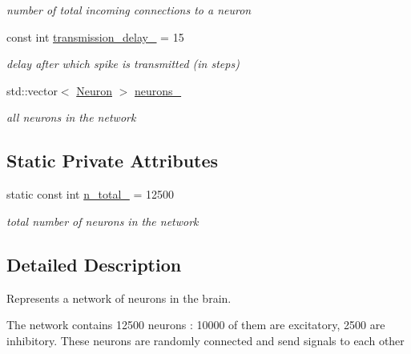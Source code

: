 \begin{DoxyCompactItemize}
\begin{DoxyCompactList}\small\item\em number of total incoming connections to a neuron \end{DoxyCompactList}\item 
\hypertarget{classNetwork_a054ac558c5f02fe3c1ed1ffbfa911d76}{const int \hyperlink{classNetwork_a054ac558c5f02fe3c1ed1ffbfa911d76}{transmission\-\_\-delay\-\_\-} = 15}\label{classNetwork_a054ac558c5f02fe3c1ed1ffbfa911d76}

\begin{DoxyCompactList}\small\item\em delay after which spike is transmitted (in steps) \end{DoxyCompactList}\item 
\hypertarget{classNetwork_a3446a7d3d832830dc206d5c9e41a58d8}{std\-::vector$<$ \hyperlink{classNeuron}{Neuron} $>$ \hyperlink{classNetwork_a3446a7d3d832830dc206d5c9e41a58d8}{neurons\-\_\-}}\label{classNetwork_a3446a7d3d832830dc206d5c9e41a58d8}

\begin{DoxyCompactList}\small\item\em all neurons in the network \end{DoxyCompactList}\end{DoxyCompactItemize}
\subsection*{Static Private Attributes}
\begin{DoxyCompactItemize}
\item 
\hypertarget{classNetwork_a6f679700d24599aeaeabb7b1415e8625}{static const int \hyperlink{classNetwork_a6f679700d24599aeaeabb7b1415e8625}{n\-\_\-total\-\_\-} = 12500}\label{classNetwork_a6f679700d24599aeaeabb7b1415e8625}

\begin{DoxyCompactList}\small\item\em total number of neurons in the network \end{DoxyCompactList}\end{DoxyCompactItemize}


\subsection{Detailed Description}
Represents a network of neurons in the brain. 

The network contains 12500 neurons \-: 10000 of them are excitatory, 2500 are inhibitory. These neurons are randomly connected and send signals to each other

